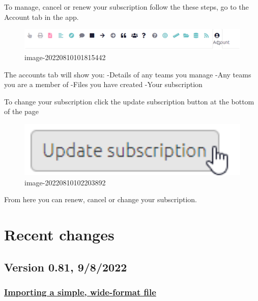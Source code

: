 \documentclass[
]{book}
\begin{document}
To manage, cancel or renew your subscription follow the these steps, go to the Account tab in the app.

\begin{figure}
\centering
\includegraphics[width=6.77083in,height=\textheight]{_assets/image-20220810101815442.png}
\caption{image-20220810101815442}
\end{figure}

The accounts tab will show you:
-Details of any teams you manage
-Any teams you are a member of
-Files you have created
-Your subscription

To change your subscription click the update subscription button at the bottom of the page

\begin{figure}
\centering
\includegraphics[width=6.77083in,height=\textheight]{_assets/image-20220810102203892.png}
\caption{image-20220810102203892}
\end{figure}

From here you can renew, cancel or change your subscription.

\hypertarget{changelog}{%
\chapter{Recent changes}\label{changelog}}

\hypertarget{version-0.81-982022}{%
\section{Version 0.81, 9/8/2022}\label{version-0.81-982022}}

\hypertarget{importing-a-simple-wide-format-file}{%
\subsection{\texorpdfstring{\protect\hyperlink{upload-summary}{Importing a simple, wide-format file}}{Importing a simple, wide-format file}}\label{importing-a-simple-wide-format-file}}
\end{document}
